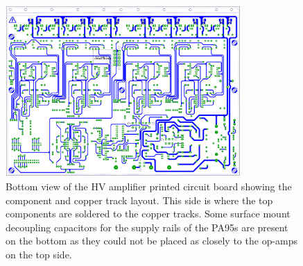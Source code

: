 \clearpage
\begin{figure}
  \centering
  \includegraphics[width=0.8\textwidth]{graphics/60-hv-amp-bottom.pdf}
  \caption[High voltage amplifier board, bottom view]{\label{fig:hv-amp-bottom}Bottom view of the \gls{HV} amplifier printed circuit board showing the component and copper track layout. This side is where the top components are soldered to the copper tracks. Some surface mount decoupling capacitors for the supply rails of the PA95s are present on the bottom as they could not be placed as closely to the op-amps on the top side.}
\end{figure}
\clearpage